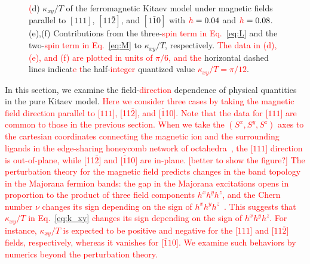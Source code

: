 \documentclass[twocolumn,superscriptaddress,showpacs, longbibliography, aps, prb]{revtex4-2}
\newcommand{\red}[1]{\textcolor{red}{#1}}
\newcommand{\blue}[1]{\textcolor{blue}{#1}}
\begin{document}
\begin{figure}[htb]
{\red{(}d) $\kappa_{xy}/T$ of the ferromagnetic Kitaev model under magnetic fields parallel to $[111]$, $[11\bar{2}]$, and $[1\bar{1}0]$ with $%
\red{h}%
=0.04$ and $%
\red{h}%
= 0.08$. (e),(f) Contributions from the three-\red{spin term in Eq.~\eqref{eq:L}} %
and the two-\red{spin term in Eq.~\eqref{eq:M}} %
to $\kappa_{xy}/T$, respectively. %
\red{The data in (d), (e), and (f) are plotted in units of $\pi/6$, and the} horizontal dashed lines indicat\red{e %
t}he half-\red{integer} quantized value \red{$\kappa_{xy}/T = \pi/12$}. 
  }
  \label{fig:CMF_ab}
\end{figure}

In this section, we examine the field-\red{direction} %
dependence of physical quantities in the pure Kitaev model.
\red{Here we consider three cases by taking the magnetic field direction parallel to [$111$], [11$\bar{2}$], and [$\bar{1}$10]. 
Note that the data for [$111$] are common to those in the previous section. 
When we take the $(S^x, S^y, S^z)$ axes to the cartesian coordinates connecting the magnetic ion and the surrounding ligands in the edge-sharing honeycomb network of octahedra~\cite{Jackeli_PRL2009},  the [$111$] direction is out-of-plane, while [11$\bar{2}$] and [$\bar{1}$10] are in-plane.} 
\red{[better to show the figure?]} 
\red{The perturbation theory for the magnetic field predicts changes in the band topology in the Majorana fermion bands: the gap in the Majorana excitations opens in proportion to the product of three field components $h^x h^y h^z$, and the Chern number $\nu$ changes its sign depending on the sign of $h^x h^y h^z$~\cite{Kitaev2006}. 
This suggests that $\kappa_{xy}/T$ in Eq.~\eqref{eq:k_xy} changes its sign depending on the sign of $h^x h^y h^z$. 
For instance, $\kappa_{xy}/T$ is expected to be positive and negative for the [$111$] and [$11\bar{2}]$ fields, respectively, whereas it vanishes for [$\bar{1}10$].
We examine such behaviors by numerics beyond the perturbation theory.} 
\end{document}
